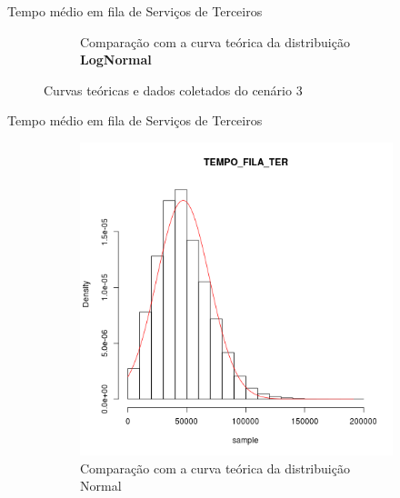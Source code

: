 \documentclass[xcolor=dvipsnames]{beamer}
\begin{document}
\begin{frame}{Tempo médio em fila de Serviços de Terceiros}
\begin{figure}[H]
\begin{subfigure}[H]{0.4\textwidth}
			\caption{Comparação com a curva teórica da distribuição \textbf{LogNormal}}
			\label{fig:C3-logn}
		\end{subfigure}
		\caption{Curvas teóricas e dados coletados do cenário 3}
	\end{figure}
\end{frame}

\begin{frame}{Tempo médio em fila de Serviços de Terceiros}
	\begin{figure}[H]
		\centering
		\begin{subfigure}[H]{0.4\textwidth}
			\includegraphics[width=\textwidth]{img/C4-hist-norm-TEMPO_FILA_TER.png}
			\caption{Comparação com a curva teórica da distribuição Normal}
			\label{fig:C4-norm}
		\end{subfigure}
		\begin{subfigure}[H]{0.4\textwidth}

\end{subfigure}
\end{figure}
\end{frame}
\end{document}
